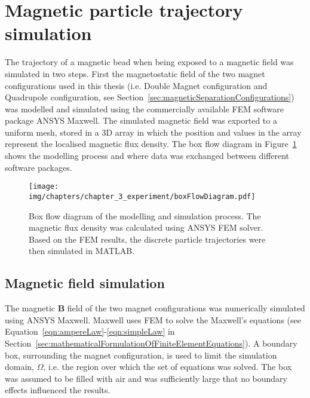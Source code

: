 \section{Magnetic particle trajectory simulation}
\label{sec:magneticParticleTrajectorySimulation}
The trajectory of a magnetic bead when being exposed to a magnetic field was simulated in two steps. First the magnetostatic field of the two magnet configurations used in this thesis (i.e. Double Magnet configuration and Quadrupole configuration, see Section~\ref{sec:magneticSeparationConfigurations}) was modelled and simulated using the commercially available FEM software package ANSYS Maxwell. The simulated magnetic field was exported to a uniform mesh, stored in a 3D array in which the position and values in the array represent the localised magnetic flux density. The box flow diagram in Figure~\ref{fig:boxFlowDiagram} shows the modelling process and where data was exchanged between different software packages.

\begin{figure}[htb]
	\centering
	\texttt{[image: img/chapters/chapter\_3\_experiment/boxFlowDiagram.pdf]}
	\caption[Box flow diagram for particle separation simulation]{Box flow diagram of the modelling and simulation process. The magnetic flux density was calculated using ANSYS FEM solver. Based on the FEM results, the discrete particle trajectories were then simulated in MATLAB.}
	\label{fig:boxFlowDiagram}
\end{figure}

\subsection{Magnetic field simulation}
The magnetic $\mathbf{B}$ field of the two magnet configurations was numerically simulated using ANSYS Maxwell. Maxwell uses FEM to solve the Maxwell's equations (see Equation~\ref{eqn:ampereLaw}-\ref{eqn:simpleLaw} in Section~\ref{sec:mathematicalFormulationOfFiniteElementEquations}). A boundary box, surrounding the magnet configuration, is used to limit the simulation domain, $\Omega$, i.e. the region over which the set of equations was solved. The box was assumed to be filled with air and was sufficiently large that no boundary effects influenced the results.


